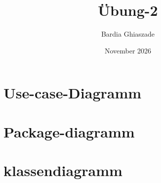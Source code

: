 \documentclass{article}
\title{Übung-2}
\author{Bardia Ghiaszade}
\date{November 2026}
\begin{document}
\maketitle

\section{Use-case-Diagramm}


\newpage




\newpage

\section{Package-diagramm}


\newpage



\newpage

\section{klassendiagramm}



\newpage


\end{document}
